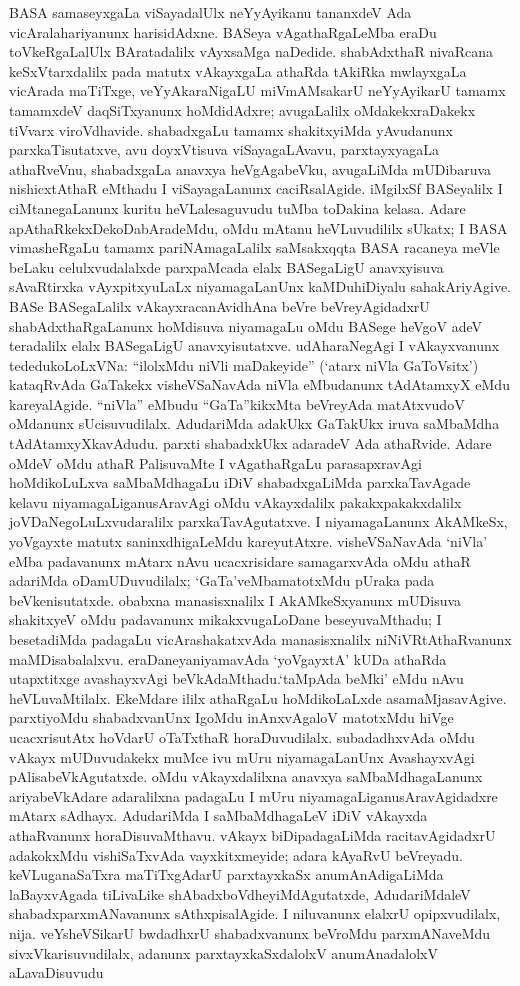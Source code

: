 BASA samaseyxgaLa viSayadalUlx neYyAyikanu tananxdeV Ada vicAralahariyanunx harisidAdxne. BASeya vAgathaRgaLeMba eraDu toVkeRgaLalUlx BAratadalilx vAyxsaMga naDedide. shabAdxthaR nivaRcana keSxVtarxdalilx pada matutx vAkayxgaLa athaRda tAkiRka mwlayxgaLa vicArada maTiTxge, veYyAkaraNigaLU miVmAMsakarU neYyAyikarU tamamx tamamxdeV daqSiTxyanunx hoMdidAdxre; avugaLalilx oMdakekxraDakekx tiVvarx viroVdhavide. shabadxgaLu tamamx shakitxyiMda yAvudanunx parxkaTisutatxve, avu doyxVtisuva viSayagaLAvavu, parxtayxya\-gaLa athaRveVnu, shabadxgaLa anavxya heVgAgabeVku, avugaLiMda mUDibaruva nishicx\-tAthaR eMthadu I viSayagaLanunx caciRsalAgide. iMgilxSf BASeyalilx I ciMtane\-gaLanunx kuritu heVLalesaguvudu tuMba toDakina kelasa. Adare apAthaRkekxDekoDabAradeMdu, oMdu mAtanu heVLuvudililx sUkatx; I BASA vimasheRgaLu tamamx pariNAmagaLalilx saMsakxqqta BASA racaneya meVle beLaku celulxvudalalxde parxpaMcada elalx BASegaLigU anavxyisuva sAvaRtirxka vAyxpitxyuLaLx niyamagaLanUnx kaMDuhiDiyalu sahakAri\-yAgive. BASe BASegaLalilx vAkayxracanAvidhAna beVre beVreyAgidadxrU shabAdxthaRgaLanunx hoMdi\-suva niyamagaLu oMdu BASege heVgoV adeV teradalilx elalx BASegaLigU anavxyi\-sutatxve. udAharaNegAgi I vAkayxvanunx tededukoLoLxVNa: ``ilolxMdu niVli maDake\-yide'' (`atarx niVla GaToVsitx') kataqRvAda GaTakekx visheVSaNavAda niVla eMbu\-danunx tAdAtamxyX eMdu kareyalAgide. ``niVla'' eMbudu ``GaTa''kikxMta beVreyAda matAtx\-vudoV oMdanunx sUcisuvudilalx. AdudariMda adakUkx GaTakUkx iruva saMbaMdha tAdAtamxyXkavAdudu. parxti shabadxkUkx adaradeV Ada athaRvide. Adare oMdeV oMdu athaR PalisuvaMte I vAgathaRgaLu parasapxravAgi hoMdikoLuLxva saMbaMdhagaLu iDiV shabadxgaLiMda parxkaTavAgade kelavu niyamagaLiganusAravAgi oMdu vAkayxdalilx pakakxpakakx\-dalilx joVDaNegoLuLxvudaralilx parxkaTavAgutatxve. I niyamagaLanunx AkAMkeSx, yoVgayxte matutx saninxdhigaLeMdu kareyutAtxre. visheVSaNavAda `niVla' eMba padavanunx mAtarx nAvu ucacxrisidare samagarxvAda oMdu athaR adariMda oDamUDuvudilalx; `GaTa'veMba\break \hbox{matotxMdu} pUraka pada beVkenisutatxde. obabxna manasisxnalilx I AkAMkeSxyanunx mUDi\-suva shakitxyeV oMdu padavanunx mikakxvugaLoDane beseyuvaMthadu; I besetadiMda padagaLu vicArashakatxvAda manasisxnalilx niNiVRtAthaRvanunx maMDisabalalxvu. eraDaneya\break niyamavAda `yoVgayxtA' kUDa athaRda utapxtitxge avashayxvAgi beVkAdaMthadu.\break `taMpAda beMki' eMdu nAvu heVLuvaMtilalx. EkeMdare ililx athaRgaLu hoMdikoLaLxde asamaMjasavAgive. parxtiyoMdu shabadxvanUnx IgoMdu inAnxvAgaloV matotxMdu hiVge ucacxrisutAtx hoVdarU oTaTxthaR horaDuvudilalx. subadadhxvAda oMdu vAkayx mUDuvudakekx muMce ivu mUru niyamagaLanUnx AvashayxvAgi pAlisabeVkAgutatxde. oMdu vAkayxdalilxna anavxya saMbaMdhagaLanunx ariyabeVkAdare adaralilxna padagaLu I mUru niyamagaLiganusAravAgidadxre mAtarx sAdhayx. AdudariMda I saMbaMdhagaLeV iDiV vAkayxda athaRvanunx horaDisuvaMthavu. vAkayx biDipadagaLiMda racitavAgidadxrU adakokxMdu vishiSaTxvAda vayxkitxmeyide; adara kAyaRvU beVreyadu. keVLuganaSaTxra maTiTxgAdarU parxtayxkaSx anumAnAdigaLiMda laBayxvAgada tiLivaLike shAbadxboVdheyiMdA\-gutatxde, AdudariMdaleV shabadxparxmANavanunx sAthxpisalAgide. I niluvanunx elalxrU opipx\-vudilalx, nija. veYsheVSikarU bwdadhxrU shabadxvanunx beVroMdu parxmANaveMdu sivxVkarisu\-vudilalx, adanunx parxtayxkaSxdalolxV anumAnadalolxV aLavaDisuvudu 